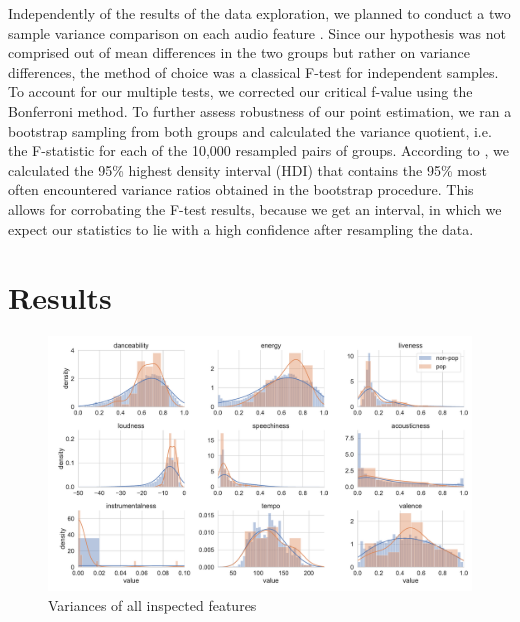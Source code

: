 \documentclass{article}
\begin{document}
Independently of the results of the data exploration, we planned to conduct a two sample variance comparison on each audio feature \citep{snedecor1989}. Since our hypothesis was not comprised out of mean differences in the two groups but rather on variance differences, the method of choice was a classical F-test for independent samples. To account for our multiple tests, we corrected our critical f-value using the Bonferroni method. To further assess robustness of our point estimation, we ran a bootstrap sampling from both groups and calculated the variance quotient, i.e. the F-statistic for each of the 10,000 resampled pairs of groups. According to \cite{kruschke2014},
we calculated the 95\% highest density interval (HDI) that contains the 95\%  most often encountered variance ratios obtained in the bootstrap procedure. This allows for corrobating the F-test results, because we get an interval, in which we expect our statistics to lie with a high confidence after resampling the data.

\section{Results}

\begin{figure}
  \centering
  \includegraphics[width=1\linewidth]{../fig/002_variances.pdf}
  \vspace*{-8mm}
  \caption{Variances of all inspected features}
\end{figure}
\end{document}
